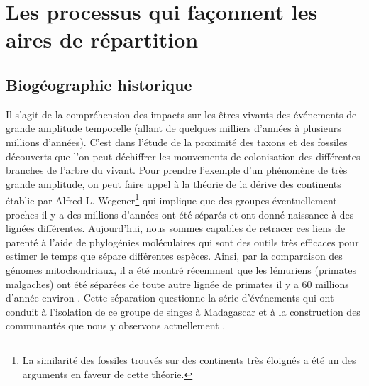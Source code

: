 \section*{Les processus qui façonnent les aires de
répartition}\label{les-processus-qui-fauxe7onnent-les-aires-de-ruxe9partition}

\subsection*{Biogéographie
historique}\label{bioguxe9ographie-historique}

Il s'agit de la compréhension des impacts sur les êtres vivants des
événements de grande amplitude temporelle (allant de quelques milliers
d'années à plusieurs millions d'années). C'est dans l'étude de la
proximité des taxons et des fossiles découverts que l'on peut déchiffrer
les mouvements de colonisation des différentes branches de l'arbre du
vivant. Pour prendre l'exemple d'un phénomène de très grande amplitude,
on peut faire appel à la théorie de la dérive des continents établie par
Alfred L. Wegener\footnote{La similarité des fossiles trouvés sur des
  continents très éloignés a été un des arguments en faveur de cette
  théorie.} qui implique que des groupes éventuellement proches il y a
des millions d'années ont été séparés et ont donné naissance à des
lignées différentes. Aujourd'hui, nous sommes capables de retracer ces
liens de parenté à l'aide de phylogénies moléculaires qui sont des
outils très efficaces pour estimer le temps que sépare différentes
espèces. Ainsi, par la comparaison des génomes mitochondriaux, il a été
montré récemment que les lémuriens (primates malgaches) ont été séparées
de toute autre lignée de primates il y a 60 millions d'année environ
\citep{Finstermeier2013}. Cette séparation questionne la série
d'événements qui ont conduit à l'isolation de ce groupe de singes à
Madagascar et à la construction des communautés que nous y observons
actuellement \citep{Razafindratsima2013}.


